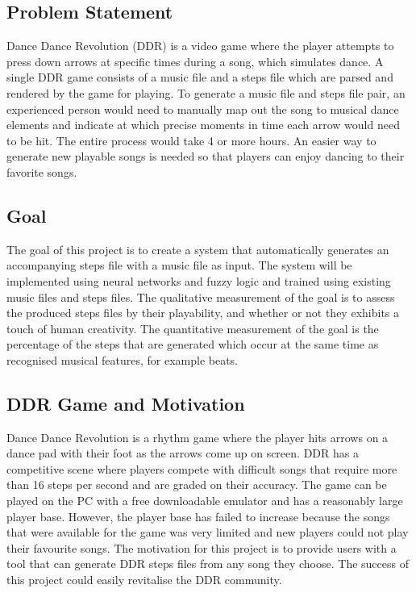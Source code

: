 \subsection{Problem Statement}
Dance Dance Revolution (DDR) is a video game where the player attempts to press down arrows at specific times during a song, which simulates dance. A single DDR game consists of a music file and a steps file which are parsed and rendered by the game for playing. To generate a music file and steps file pair, an experienced person would need to manually map out the song to musical dance elements and indicate at which precise moments in time each arrow would need to be hit. The entire process would take 4 or more hours. An easier way to generate new playable songs is needed so that players can enjoy dancing to their favorite songs.\\

\subsection{Goal}
The goal of this project is to create a system that automatically generates an accompanying steps file with a music file as input. The system will be implemented using neural networks and fuzzy logic and trained using existing music files and steps files. The qualitative measurement of the goal is to assess the produced steps files by their playability, and whether or not they exhibits a touch of human creativity. The quantitative measurement of the goal is the percentage of the steps that are generated which occur at the same time as recognised musical features, for example beats.\\


\subsection{DDR Game and Motivation}
Dance Dance Revolution is a rhythm game where the player hits arrows on a dance pad with their foot as the arrows come up on screen. DDR has a competitive scene where players compete with difficult songs that require more than 16 steps per second and are graded on their accuracy. The game can be played on the PC with a free downloadable emulator and has a reasonably large player base. However, the player base has failed to increase because the songs that were available for the game was very limited and new players could not play their favourite songs. The motivation for this project is to provide users with a tool that can generate DDR steps files from any song they choose. The success of this project could easily revitalise the DDR community.